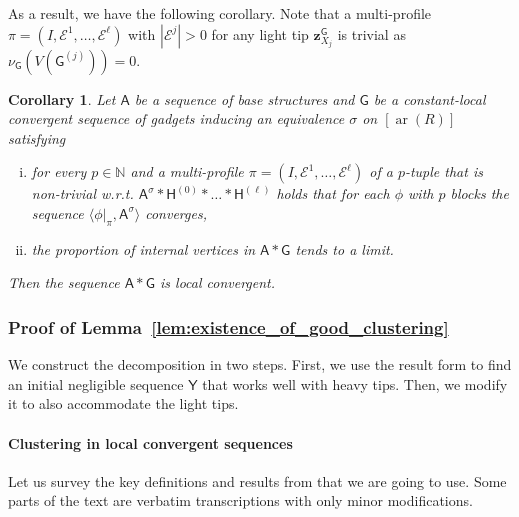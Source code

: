 \documentclass[11pt]{article}
\theoremstyle{plain}
\newtheorem{corollary}[theorem]{Corollary}
\theoremstyle{definition}
\theoremstyle{remark}
\DeclareMathOperator\aritysym{ar}
\newcommand{\arity}[1]{{\aritysym({#1})}}
\newcommand{\N}{\mathbb{N}}
\newcommand{\stonepar}[2]{\langle #1, #2 \rangle}
\newcommand{\strseq}[1]{{\boldsymbol{\mathsf{#1}}}}
\newcommand{\seq}[1]{{\mathsf{#1}}}
\newcommand{\tpl}[1]{{\bm{#1}}}
\begin{document}
As a result, we have the following corollary.
Note that a multi-profile $\pi = (I, \mathcal{E}^1, \dots, \mathcal{E}^\ell)$ with $|\mathcal{E}^j| > 0$ for any light tip $\tpl{z}^\strseq{G}_{X_j}$ is trivial as $\nu_\strseq{G}(V(\strseq{G}^{(j)})) = 0$.

\begin{corollary}\label{cor:loc_fragmented_structures} 
    Let $\strseq{A}$ be a sequence of base structures and $\strseq{G}$ be a constant-local convergent sequence of gadgets inducing an equivalence $\sigma$ on $[\arity{R}]$ satisfying
    \begin{enumerate}[(i)]
        \item for every $p \in \N$ and a multi-profile $\pi = (I, \mathcal{E}^1, \dots, \mathcal{E}^\ell)$ of a $p$-tuple that is non-trivial w.r.t. $\strseq{A}^\sigma*\strseq{H}^{(0)}*\dots*\strseq{H}^{(\ell)}$ holds that for each $\phi$ with $p$ blocks the sequence $\stonepar{\phi|_\pi}{\strseq{A}^\sigma}$ converges,
        \item the proportion of internal vertices in $\strseq{A}*\strseq{G}$ tends to a limit.
    \end{enumerate}
    Then the sequence $\strseq{A}*\strseq{G}$ is local convergent.
\end{corollary}

\subsubsection{Proof of Lemma~\ref{lem:existence_of_good_clustering}}\label{sssec:proof_of_good_clustering}

We construct the decomposition in two steps.
First, we use the result form \cite{clustering} to find an initial negligible sequence $\seq{Y}$ that works well with heavy tips.
Then, we modify it to also accommodate the light tips.

\paragraph{Clustering in local convergent sequences}\label{par:clustering_in_local_convergent_sequences}

Let us survey the key definitions and results from \cite{clustering} that we are going to use.
Some parts of the text are verbatim transcriptions with only minor modifications.
\end{document}
